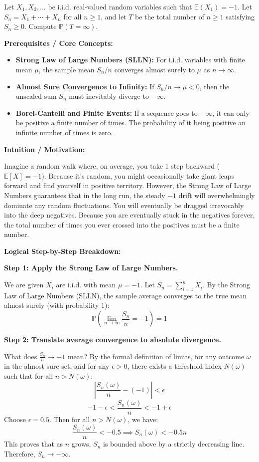 \begin{exercise}\label{probability:2016:5}
Let $X_1, X_2, \ldots$ be i.i.d. real-valued random variables such that $\mathbb{E}(X_1) = -1$. Let $S_n = X_1 + \cdots + X_n$ for all $n \geq 1$, and let $T$ be the total number of $n \geq 1$ satisfying $S_n \geq 0$. Compute $\mathbb{P}(T = \infty)$.
\end{exercise}
\begin{solution}
\textbf{Prerequisites / Core Concepts:}
\begin{itemize}
    \item \textbf{Strong Law of Large Numbers (SLLN):} For i.i.d. variables with finite mean $\mu$, the sample mean $S_n/n$ converges almost surely to $\mu$ as $n \to \infty$.
    \item \textbf{Almost Sure Convergence to Infinity:} If $S_n / n \to \mu < 0$, then the unscaled sum $S_n$ must inevitably diverge to $-\infty$.
    \item \textbf{Borel-Cantelli and Finite Events:} If a sequence goes to $-\infty$, it can only be positive a finite number of times. The probability of it being positive an infinite number of times is zero.
\end{itemize}

\textbf{Intuition / Motivation:}

Imagine a random walk where, on average, you take 1 step backward ($\mathbb{E}[X] = -1$). Because it's random, you might occasionally take giant leaps forward and find yourself in positive territory. However, the Strong Law of Large Numbers guarantees that in the long run, the steady $-1$ drift will overwhelmingly dominate any random fluctuations. You will eventually be dragged irrevocably into the deep negatives. Because you are eventually stuck in the negatives forever, the total number of times you ever crossed into the positives must be a finite number.

\textbf{Logical Step-by-Step Breakdown:}

\textbf{Step 1: Apply the Strong Law of Large Numbers.}

We are given $X_i$ are i.i.d. with mean $\mu = -1$.
Let $S_n = \sum_{i=1}^n X_i$.
By the Strong Law of Large Numbers (SLLN), the sample average converges to the true mean almost surely (with probability 1):
\[ \mathbb{P}\left( \lim_{n \to \infty} \frac{S_n}{n} = -1 \right) = 1 \]

\textbf{Step 2: Translate average convergence to absolute divergence.}

What does $\frac{S_n}{n} \to -1$ mean? By the formal definition of limits, for any outcome $\omega$ in the almost-sure set, and for any $\epsilon > 0$, there exists a threshold index $N(\omega)$ such that for all $n > N(\omega)$:
\[ \left| \frac{S_n(\omega)}{n} - (-1) \right| < \epsilon \]
\[ -1 - \epsilon < \frac{S_n(\omega)}{n} < -1 + \epsilon \]
Choose $\epsilon = 0.5$. Then for all $n > N(\omega)$, we have:
\[ \frac{S_n(\omega)}{n} < -0.5 \implies S_n(\omega) < -0.5n \]
This proves that as $n$ grows, $S_n$ is bounded above by a strictly decreasing line. Therefore, $S_n \to -\infty$.


\end{solution}
